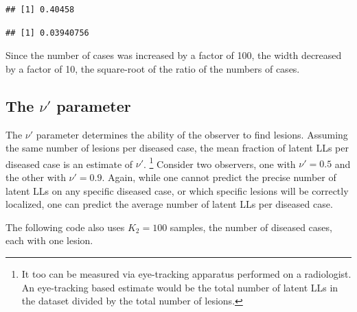 \documentclass[
]{book}
\newenvironment{Shaded}{\begin{snugshade}}{\end{snugshade}}
\newcommand{\DecValTok}[1]{\textcolor[rgb]{0.00,0.00,0.81}{#1}}
\newcommand{\NormalTok}[1]{#1}
\newcommand{\OperatorTok}[1]{\textcolor[rgb]{0.81,0.36,0.00}{\textbf{#1}}}
\newcommand{\StringTok}[1]{\textcolor[rgb]{0.31,0.60,0.02}{#1}}
\begin{document}
\begin{Shaded}
\end{Shaded}

\begin{verbatim}
## [1] 0.40458
\end{verbatim}

\begin{Shaded}
\end{Shaded}

\begin{verbatim}
## [1] 0.03940756
\end{verbatim}

Since the number of cases was increased by a factor of 100, the width decreased by a factor of 10, the square-root of the ratio of the numbers of cases.

\hypertarget{rsm-summary-nu-parameter}{%
\subsection{\texorpdfstring{The \(\nu'\) parameter}{The \textbackslash nu' parameter}}\label{rsm-summary-nu-parameter}}

The \(\nu'\) parameter determines the ability of the observer to find lesions. Assuming the same number of lesions per diseased case, the mean fraction of latent LLs per diseased case is an estimate of \(\nu'\). \footnote{It too can be measured via eye-tracking apparatus performed on a radiologist. An eye-tracking based estimate would be the total number of latent LLs in the dataset divided by the total number of lesions.} Consider two observers, one with \(\nu' = 0.5\) and the other with \(\nu' = 0.9\). Again, while one cannot predict the precise number of latent LLs on any specific diseased case, or which specific lesions will be correctly localized, one can predict the average number of latent LLs per diseased case.

The following code also uses \(K_2 = 100\) samples, the number of diseased cases, each with one lesion.
\end{document}
